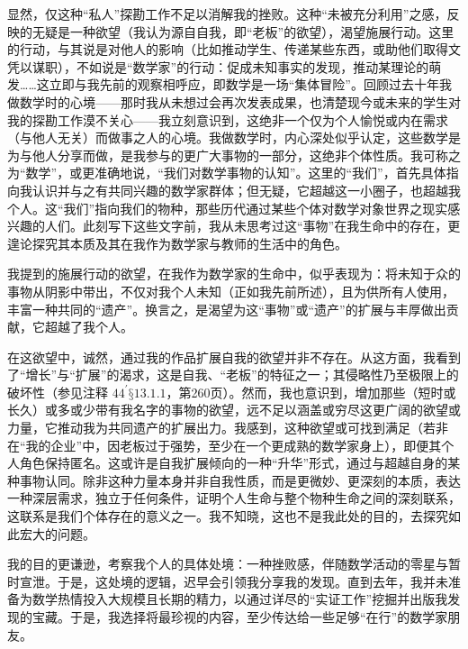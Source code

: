 显然，仅这种“私人”探勘工作不足以消解我的挫败。这种“未被充分利用”之感，反映的无疑是一种欲望（我认为源自自我，即“老板”的欲望），渴望施展行动。这里的行动，与其说是对他人的影响（比如推动学生、传递某些东西，或助他们取得文凭以谋职），不如说是“数学家”的行动：促成未知事实的发现，推动某理论的萌发……这立即与我先前的观察相呼应，即数学是一场“集体冒险”。回顾过去十年我做数学时的心境——那时我从未想过会再次发表成果，也清楚现今或未来的学生对我的探勘工作漠不关心——我立刻意识到，这绝非一个仅为个人愉悦或内在需求（与他人无关）而做事之人的心境。我做数学时，内心深处似乎认定，这些数学是为与他人分享而做，是我参与的更广大事物的一部分，这绝非个体性质。我可称之为“数学”，或更准确地说，“我们对数学事物的认知”。这里的“我们”，首先具体指向我认识并与之有共同兴趣的数学家群体；但无疑，它超越这一小圈子，也超越我个人。这“我们”指向我们的物种，那些历代通过某些个体对数学对象世界之现实感兴趣的人们。此刻写下这些文字前，我从未思考过这“事物”在我生命中的存在，更遑论探究其本质及其在我作为数学家与教师的生活中的角色。

我提到的施展行动的欲望，在我作为数学家的生命中，似乎表现为：将未知于众的事物从阴影中带出，不仅对我个人未知（正如我先前所述），且为供所有人使用，丰富一种共同的“遗产”。换言之，是渴望为这“事物”或“遗产”的扩展与丰厚做出贡献，它超越了我个人。

在这欲望中，诚然，通过我的作品扩展自我的欲望并非不存在。从这方面，我看到了“增长”与“扩展”的渴求，这是自我、“老板”的特征之一；其侵略性乃至极限上的破坏性（参见注释 \({44}^{\prime }§{13.1.1}\)，第260页）。然而，我也意识到，增加那些（短时或长久）或多或少带有我名字的事物的欲望，远不足以涵盖或穷尽这更广阔的欲望或力量，它推动我为共同遗产的扩展出力。我感到，这种欲望或可找到满足（若非在“我的企业”中，因老板过于强势，至少在一个更成熟的数学家身上），即便其个人角色保持匿名。这或许是自我扩展倾向的一种“升华”形式，通过与超越自身的某种事物认同。除非这种力量本身并非自我性质，而是更微妙、更深刻的本质，表达一种深层需求，独立于任何条件，证明个人生命与整个物种生命之间的深刻联系，这联系是我们个体存在的意义之一。我不知晓，这也不是我此处的目的，去探究如此宏大的问题。

我的目的更谦逊，考察我个人的具体处境：一种挫败感，伴随数学活动的零星与暂时宣泄。于是，这处境的逻辑，迟早会引领我分享我的发现。直到去年，我并未准备为数学热情投入大规模且长期的精力，以通过详尽的“实证工作”挖掘并出版我发现的宝藏。于是，我选择将最珍视的内容，至少传达给一些足够“在行”的数学家朋友。

